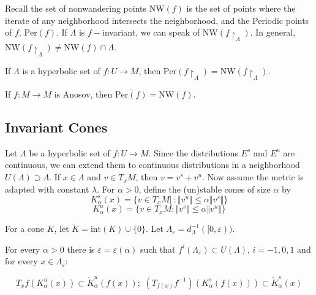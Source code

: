 Recall the set of nonwandering points $\mathrm{NW}(f)$ is the set of points where the iterate of any neighborhood intersects the neighborhood, and the Periodic points of $f$, $\mathrm{Per}(f)$. If $\Lambda$ is $f-$invariant, we can speak of $\mathrm{NW}(f \restriction_{\Lambda})$. In general, $\mathrm{NW}(f \restriction_{\Lambda}) \neq \mathrm{NW}(f) \cap \Lambda$.

\begin{prop}

If $\Lambda$ is a hyperbolic set of $f:U \to M$, then $\overline{\mathrm{Per}(f\restriction_{\Lambda})} = \mathrm{NW}(f \restriction_{\Lambda})$.

\end{prop}

\begin{cor}
If $f:M \to M$ is Anosov, then $\overline{\mathrm{Per}(f)}=\mathrm{NW}(f)$.
\end{cor}

\subsection{Invariant Cones}

\indent Let $\Lambda$ be a hyperbolic set of $f:U \to M$. Since the distributions $E^s$ and $E^u$ are continuous, we can extend them to continuous distributions in a neighborhood $U(\Lambda) \supset \Lambda$. If $x \in \Lambda$ and $v \in T_xM$, then $v=v^s+v^u$. Now assume the metric is adapted with constant $\lambda$. For $\alpha >0$, define the (un)stable cones of size $\alpha$ by 
\[K^s_{\alpha}(x)=\{ v \in T_xM|\ : \Vert v^u \Vert \leq \alpha \Vert v^s \Vert \}\]
\[K^u_{\alpha}(x) = \{ v \in T_xM : \Vert v^s \Vert \leq \alpha \Vert v^u \Vert \}\]

\indent For a cone $K$, let $\mathring{K}=\mathrm{int}(K) \cup \{0\}$. Let $\Lambda_{\varepsilon}= d_{\Lambda}^{-1}([0,\varepsilon))$.

\begin{prop}

For every $\alpha>0$ there is $\varepsilon=\varepsilon(\alpha)$ such that $f^i(\Lambda_{\varepsilon}) \subset U(\Lambda)$, $i=-1,0,1$ and for every $x \in \Lambda_{\varepsilon}$:

\[T_xf(K^u_{\alpha}(x)) \subset \mathring{K}^u_{\alpha}(f(x)); \hspace{4pt} (T_{f(x)}f^{-1})(K^s_{\alpha}(f(x))) \subset \mathring{K}^{s}_{\alpha}(x)\]

\end{prop}

